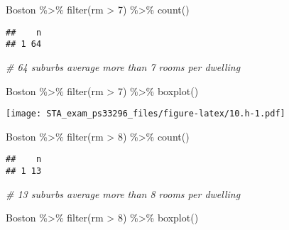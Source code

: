 \documentclass[
]{article}
\newenvironment{Shaded}{\begin{snugshade}}{\end{snugshade}}
\newcommand{\CommentTok}[1]{\textcolor[rgb]{0.56,0.35,0.01}{\textit{#1}}}
\newcommand{\DecValTok}[1]{\textcolor[rgb]{0.00,0.00,0.81}{#1}}
\newcommand{\FunctionTok}[1]{\textcolor[rgb]{0.00,0.00,0.00}{#1}}
\newcommand{\NormalTok}[1]{#1}
\newcommand{\SpecialCharTok}[1]{\textcolor[rgb]{0.00,0.00,0.00}{#1}}
\begin{document}
\begin{Shaded}
\begin{Highlighting}[]
\NormalTok{Boston }\SpecialCharTok{\%\textgreater{}\%} 
  \FunctionTok{filter}\NormalTok{(rm }\SpecialCharTok{\textgreater{}} \DecValTok{7}\NormalTok{) }\SpecialCharTok{\%\textgreater{}\%} \FunctionTok{count}\NormalTok{()}
\end{Highlighting}
\end{Shaded}

\begin{verbatim}
##    n
## 1 64
\end{verbatim}

\begin{Shaded}
\begin{Highlighting}[]
\CommentTok{\# 64 suburbs average more than 7 rooms per dwelling}

\NormalTok{Boston }\SpecialCharTok{\%\textgreater{}\%} 
  \FunctionTok{filter}\NormalTok{(rm }\SpecialCharTok{\textgreater{}} \DecValTok{7}\NormalTok{) }\SpecialCharTok{\%\textgreater{}\%} \FunctionTok{boxplot}\NormalTok{()}
\end{Highlighting}
\end{Shaded}

\texttt{[image: STA\_exam\_ps33296\_files/figure-latex/10.h-1.pdf]}

\begin{Shaded}
\begin{Highlighting}[]
\NormalTok{Boston }\SpecialCharTok{\%\textgreater{}\%} 
  \FunctionTok{filter}\NormalTok{(rm }\SpecialCharTok{\textgreater{}} \DecValTok{8}\NormalTok{) }\SpecialCharTok{\%\textgreater{}\%} \FunctionTok{count}\NormalTok{()}
\end{Highlighting}
\end{Shaded}

\begin{verbatim}
##    n
## 1 13
\end{verbatim}

\begin{Shaded}
\begin{Highlighting}[]
\CommentTok{\# 13 suburbs average more than 8 rooms per dwelling}

\NormalTok{Boston }\SpecialCharTok{\%\textgreater{}\%} 
  \FunctionTok{filter}\NormalTok{(rm }\SpecialCharTok{\textgreater{}} \DecValTok{8}\NormalTok{) }\SpecialCharTok{\%\textgreater{}\%} \FunctionTok{boxplot}\NormalTok{()}
\end{Highlighting}
\end{Shaded}
\end{document}
